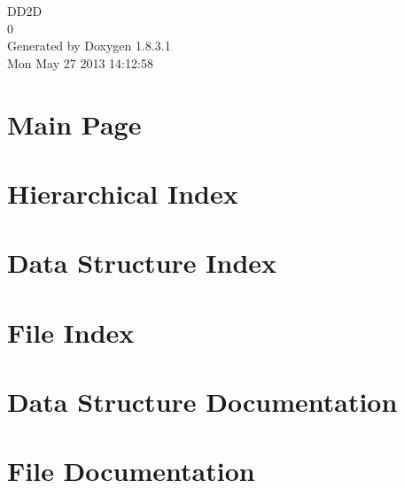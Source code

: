 \documentclass{book}
\begin{document}
\hypersetup{pageanchor=false,citecolor=blue}
\begin{titlepage}
\vspace*{7cm}
\begin{center}
{\Large D\-D2\-D \\[1ex]\large 0 }\\
\vspace*{1cm}
{\large Generated by Doxygen 1.8.3.1}\\
\vspace*{0.5cm}
{\small Mon May 27 2013 14:12:58}\\
\end{center}
\end{titlepage}
\clearemptydoublepage
{}
\tableofcontents
\clearemptydoublepage
{}
\hypersetup{pageanchor=true,citecolor=blue}
\chapter{Main Page}
\label{index}\hypertarget{index}{}
\chapter{Hierarchical Index}

\chapter{Data Structure Index}

\chapter{File Index}

\chapter{Data Structure Documentation}








\chapter{File Documentation}




















\printindex
\end{document}
